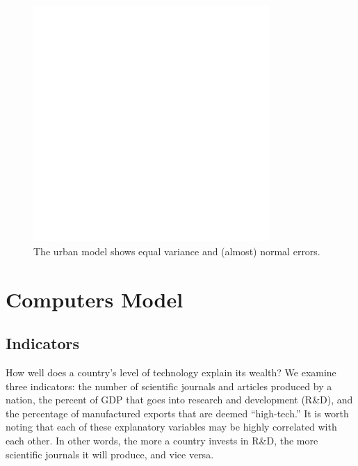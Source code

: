 \documentclass[11pt]{article}
\begin{document}
\begin{figure}[!ht]
  \centering
  \includegraphics[width=0.8\textwidth]{images/urban_model_conditions}
  \caption{\label{urban_model_conditions}The urban model shows equal variance and (almost) normal errors.}
\end{figure}







\section{Computers Model}
\label{sec:model_tech}

\subsection{Indicators}
How well does a country's level of technology explain its wealth? We examine three indicators: the number of scientific journals and articles produced by a nation, the percent of GDP that goes into research and development (R\&D), and the percentage of manufactured exports that are deemed ``high-tech.'' It is worth noting that each of these explanatory variables may be highly correlated with each other. In other words, the more a country invests in R\&D, the more scientific journals it will produce, and vice versa.
\end{document}

